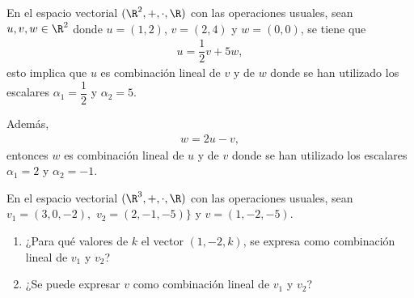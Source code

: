 \documentclass[compacto,10pt]{pubciencias-notas}
\begin{document}
\begin{ejem}\hspace{0pt} En el espacio vectorial $(\R^{2}, +, \cdot, \R)$ con las operaciones usuales, sean $u, v, w\in \R^{2}$ donde $u = (1, 2)$, $v = (2, 4)$ y $w = (0,0)$, se tiene que
\begin{gather}
\label{Comb_Lin1}
u = \dfrac{1}{2}v + 5w,
\end{gather}
esto implica que $u$ es combinación lineal de $v$ y de $w$ donde se han utilizado los escalares $\alpha_{1} = \dfrac{1}{2}$ y $\alpha_{2} = 5$.

\noindent Además,
\begin{gather}
\label{Comb_Lin2}
    w = 2u - v,
\end{gather}
entonces $w$ es combinación lineal de $u$ y de $v$ donde se han utilizado los escalares $\alpha_{1} = 2$ y $\alpha_{2} = - 1$.
\end{ejem}

\begin{ejer}\hspace{0pt} En el espacio vectorial $(\R^{3},+,\cdot,\R)$ con las operaciones usuales, sean $v_{1} = (3,0,-2),$ $v_{2}= (2,-1,-5)\}$ y $v=(1,-2,-5)$.
\begin{enumerate}
    \item ¿Para qué valores de $k$ el vector $(1,-2,k)$, se expresa como combinación lineal de $v_{1}$ y $v_{2}$?
    \item ¿Se puede expresar $v$ como combinación lineal de $v_{1}$ y $v_{2}$?
\end{enumerate}
\end{ejer}
\end{document}
